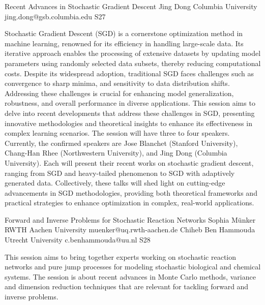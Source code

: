 \begin{session}
 {Recent Advances in Stochastic Gradient Descent}%
 {Jing Dong}%
 {Columbia University}%
 {jing.dong@gsb.columbia.edu}%
{}{}{}
 {S27}%
{}

 Stochastic Gradient Descent (SGD) is a cornerstone optimization method in machine learning,
 renowned for its efficiency in handling large-scale data. Its iterative approach enables
 the processing of extensive datasets by updating model parameters using randomly selected
 data subsets, thereby reducing computational costs. Despite its widespread adoption, traditional
 SGD faces challenges such as convergence to sharp minima, and sensitivity to data
 distribution shifts. Addressing these challenges is crucial for enhancing model generalization,
 robustness, and overall performance in diverse applications. This session aims to delve into
 recent developments that address these challenges in SGD, presenting innovative methodologies
 and theoretical insights to enhance its effectiveness in complex learning scenarios.
 The session will have three to four speakers. Currently, the confirmed speakers are Jose
 Blanchet (Stanford University), Chang-Han Rhee (Northwestern University), and Jing Dong
 (Columbia University). Each will present their recent works on stochastic gradient descent,
 ranging from SGD and heavy-tailed phenomenon to SGD with adaptively generated data.
 Collectively, these talks will shed light on cutting-edge advancements in SGD methodologies,
 providing both theoretical frameworks and practical strategies to enhance optimization in
 complex, real-world applications.
\end{session}



\clearpage

\begin{session}
 {Forward and Inverse Problems for Stochastic Reaction Networks}%
 {Sophia M\"unker}%
 {RWTH Aachen University}%
 {muenker@uq.rwth-aachen.de}%
 {Chiheb Ben Hammouda}%
 {Utrecht University}%
 {c.benhammouda@uu.nl}%
 {S28}%
 {}%

 This session aims to bring together experts working on stochastic reaction networks and pure jump processes for modeling stochastic biological and chemical systems. The session is about recent advances in Monte Carlo methods, variance and dimension reduction techniques that are relevant for tackling forward and inverse problems.
\end{session}

